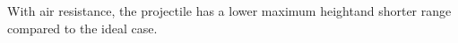 \documentclass[preview]{standalone}
\begin{document}
\begin{center}
With air resistance, the projectile has a lower maximum heightand shorter range compared to the ideal case.
\end{center}
\end{document}

